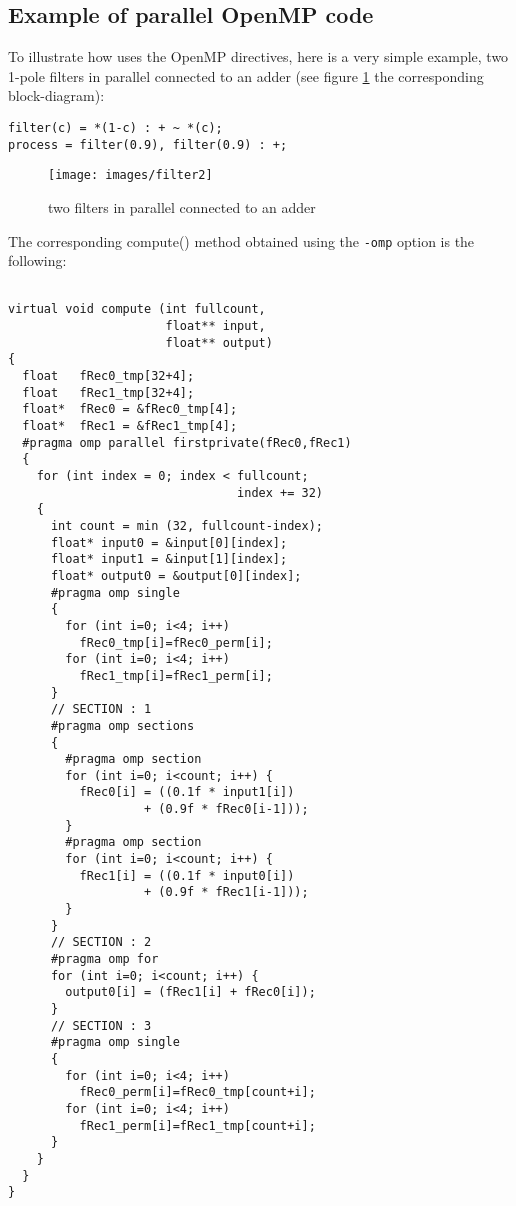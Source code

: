 \subsection{Example of parallel OpenMP code}
To illustrate how \faust uses the OpenMP directives, here is a very simple example, two 1-pole filters in parallel connected to an adder (see figure \ref{fig:parfilter} the corresponding block-diagram):

\begin{lstlisting}
filter(c) = *(1-c) : + ~ *(c);
process = filter(0.9), filter(0.9) : +; 
\end{lstlisting}

\begin{figure}[htb] 
  \centering
  \texttt{[image: images/filter2]}
  \caption{two filters in parallel connected to an adder}   
  \label{fig:parfilter}
\end{figure}

The corresponding compute() method obtained using the \lstinline!-omp! option is the following:
\begin{lstlisting}

virtual void compute (int fullcount, 
                      float** input, 
                      float** output) 
{
  float   fRec0_tmp[32+4];
  float   fRec1_tmp[32+4];
  float*  fRec0 = &fRec0_tmp[4];
  float*  fRec1 = &fRec1_tmp[4];
  #pragma omp parallel firstprivate(fRec0,fRec1)
  {
    for (int index = 0; index < fullcount; 
                                index += 32) 
    {
      int count = min (32, fullcount-index);
      float* input0 = &input[0][index];
      float* input1 = &input[1][index];
      float* output0 = &output[0][index];
      #pragma omp single
      {
        for (int i=0; i<4; i++) 
          fRec0_tmp[i]=fRec0_perm[i];
        for (int i=0; i<4; i++) 
          fRec1_tmp[i]=fRec1_perm[i];
      }
      // SECTION : 1
      #pragma omp sections
      {
        #pragma omp section
        for (int i=0; i<count; i++) {
          fRec0[i] = ((0.1f * input1[i]) 
                   + (0.9f * fRec0[i-1]));
        }
        #pragma omp section
        for (int i=0; i<count; i++) {
          fRec1[i] = ((0.1f * input0[i]) 
                   + (0.9f * fRec1[i-1]));
        }
      }
      // SECTION : 2
      #pragma omp for
      for (int i=0; i<count; i++) {
        output0[i] = (fRec1[i] + fRec0[i]);
      }
      // SECTION : 3
      #pragma omp single
      {
        for (int i=0; i<4; i++) 
          fRec0_perm[i]=fRec0_tmp[count+i];
        for (int i=0; i<4; i++) 
          fRec1_perm[i]=fRec1_tmp[count+i];
      }
    }
  }
}

\end{lstlisting}

